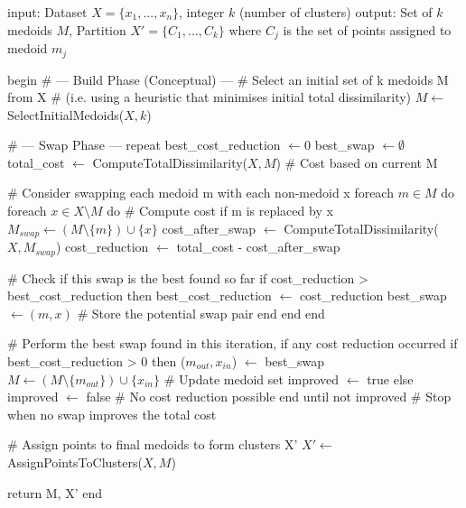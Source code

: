 \documentclass[10pt,oneside]{report}
\begin{document}
\begin{algorithm}[caption={Partitioning Around Medoids (PAM).}, label={alg:pam}]
input: Dataset $X = \{x_1, ..., x_n\}$, integer $k$ (number of clusters)
output: Set of $k$ medoids $M$, Partition $X' = \{C_1, ..., C_k\}$ where $C_j$ is the set of points assigned to medoid $m_j$

begin
    # --- Build Phase (Conceptual) ---
    # Select an initial set of k medoids M from X
    # (i.e. using a heuristic that minimises initial total dissimilarity)
    $M \gets$ SelectInitialMedoids($X, k$)

    # --- Swap Phase ---
    repeat
        best_cost_reduction $\gets 0$
        best_swap $\gets \emptyset$ 
        total_cost $\gets$ ComputeTotalDissimilarity($X, M$) # Cost based on current M

        # Consider swapping each medoid m with each non-medoid x
        foreach $m \in M$ do
            foreach $x \in X \setminus M$ do
                # Compute cost if m is replaced by x
                $M_{swap} \gets (M \setminus \{m\}) \cup \{x\}$
                cost_after_swap $\gets$ ComputeTotalDissimilarity($X, M_{swap}$)
                cost_reduction $\gets$ total_cost - cost_after_swap

                # Check if this swap is the best found so far
                if cost_reduction > best_cost_reduction then
                    best_cost_reduction $\gets$ cost_reduction
                    best_swap $\gets (m, x)$ # Store the potential swap pair
                end
            end
        end

        # Perform the best swap found in this iteration, if any cost reduction occurred
        if best_cost_reduction > 0 then
            ($m_{out}, x_{in}$) $\gets$ best_swap
            $M \gets (M \setminus \{m_{out}\}) \cup \{x_{in}\}$ # Update medoid set
            improved $\gets$ true
        else
            improved $\gets$ false # No cost reduction possible
        end
    until not improved # Stop when no swap improves the total cost

    # Assign points to final medoids to form clusters X'
    $X' \gets$ AssignPointsToClusters($X, M$)

    return M, X'
end
\end{algorithm}
\end{document}
